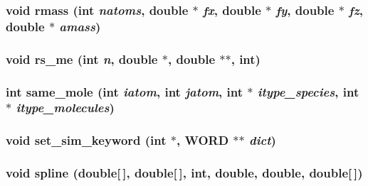 \subsubsection{\setlength{\rightskip}{0pt plus 5cm}void rmass (int {\em natoms}, double $\ast$ {\em fx}, double $\ast$ {\em fy}, double $\ast$ {\em fz}, double $\ast$ {\em amass})}\label{proto__utils_8h_81f071e06b2705ae33a2addd6a66c15d}


\subsubsection{\setlength{\rightskip}{0pt plus 5cm}void rs\_\-me (int {\em n}, double $\ast$, double $\ast$$\ast$, int)}\label{proto__utils_8h_31d8465067779fa813d2d824bded8775}


\subsubsection{\setlength{\rightskip}{0pt plus 5cm}int same\_\-mole (int {\em iatom}, int {\em jatom}, int $\ast$ {\em itype\_\-species}, int $\ast$ {\em itype\_\-molecules})}\label{proto__utils_8h_e3d0df6067ab8da08e90f66ab8c2c417}


\subsubsection{\setlength{\rightskip}{0pt plus 5cm}void set\_\-sim\_\-keyword (int $\ast$, {\bf WORD} $\ast$$\ast$ {\em dict})}\label{proto__utils_8h_d42282fe5cc392c172c3f3da2b160e48}


\subsubsection{\setlength{\rightskip}{0pt plus 5cm}void spline (double[$\,$], double[$\,$], int, double, double, double[$\,$])}\label{proto__utils_8h_18ab99a10fb62b5d9e6385bf253d4849}


